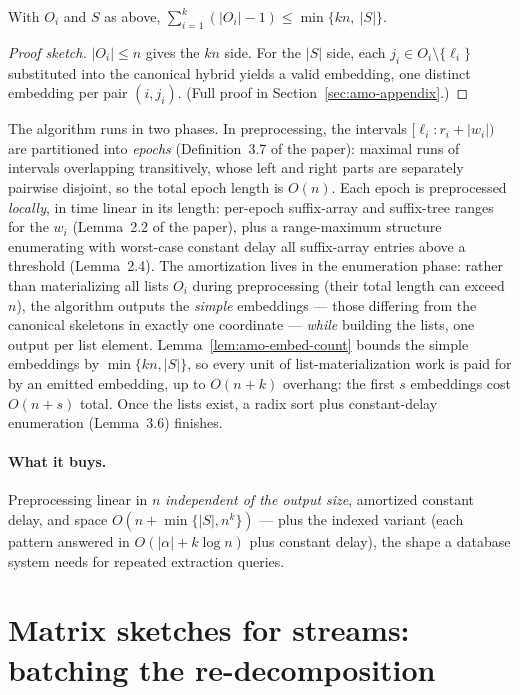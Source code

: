 \begin{lemma}\label{lem:amo-embed-count}
With $O_i$ and $S$ as above,
$\textstyle\sum_{i=1}^{k} (|O_i| - 1) \le \min\{kn,\ |S|\}$. \eop
\end{lemma}

\begin{proof}[Proof sketch]
$|O_i| \le n$ gives the $kn$ side. For the $|S|$ side, each $j_i \in O_i
\setminus\{\ell_i\}$ substituted into the canonical hybrid yields a valid
embedding, one distinct embedding per pair $(i, j_i)$. (Full proof in
Section~\ref{sec:amo-appendix}.)
\end{proof}

The algorithm runs in two phases. In preprocessing, the intervals
$[\ell_i : r_i + |w_i|)$ are partitioned into \emph{epochs}
(Definition~3.7 of the paper): maximal runs of intervals overlapping
transitively, whose left and right parts are separately pairwise disjoint,
so the total epoch length is $O(n)$. Each epoch is preprocessed
\emph{locally}, in time linear in its length: per-epoch suffix-array and
suffix-tree ranges for the $w_i$ (Lemma~2.2 of the paper), plus a
range-maximum structure enumerating with worst-case constant delay all
suffix-array entries above a threshold (Lemma~2.4). The amortization lives
in the enumeration phase: rather than materializing all lists $O_i$ during
preprocessing (their total length can exceed $n$), the algorithm outputs
the \emph{simple} embeddings --- those differing from the canonical
skeletons in exactly one coordinate --- \emph{while} building the lists,
one output per list element. Lemma~\ref{lem:amo-embed-count} bounds the
simple embeddings by $\min\{kn, |S|\}$, so every unit of
list-materialization work is paid for by an emitted embedding, up to
$O(n + k)$ overhang: the first $s$ embeddings cost $O(n + s)$ total. Once
the lists exist, a radix sort plus constant-delay enumeration (Lemma~3.6)
finishes.

\paragraph{What it buys.}
Preprocessing linear in $n$ \emph{independent of the output size},
amortized constant delay, and space $O(n + \min\{|S|, n^k\})$ --- plus the
indexed variant (each pattern answered in $O(|\alpha| + k \log n)$ plus
constant delay), the shape a database system needs for repeated extraction
queries.

\section[Matrix sketches for streams]{Matrix sketches for streams: batching the re-decomposition}
\label{sec:amo-aero}

